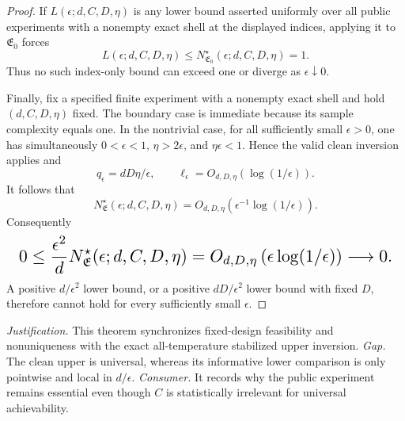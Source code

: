 \documentclass{article}
\begin{document}
\begin{proof}
If \(L(\epsilon;d,C,D,\eta)\) is any lower bound asserted uniformly over all public experiments with a nonempty exact shell at the displayed indices, applying it to \(\mathfrak E_0\) forces
\[
L(\epsilon;d,C,D,\eta)
\le N^\star_{\mathfrak E_0}(\epsilon;d,C,D,\eta)=1.
\]
Thus no such index-only bound can exceed one or diverge as \(\epsilon\downarrow0\).

Finally, fix a specified finite experiment with a nonempty exact shell and hold \((d,C,D,\eta)\) fixed. The boundary case is immediate because its sample complexity equals one. In the nontrivial case, for all sufficiently small \(\epsilon>0\), one has simultaneously \(0<\epsilon<1\), \(\eta>2\epsilon\), and \(\eta\epsilon<1\). Hence the valid clean inversion applies and
\[
q_\epsilon=dD\eta/\epsilon,
\qquad
\ell_\epsilon=O_{d,D,\eta}(\log(1/\epsilon)).
\]
It follows that
\[
N^\star_{\mathfrak E}(\epsilon;d,C,D,\eta)
=O_{d,D,\eta}\left(\epsilon^{-1}\log(1/\epsilon)\right).
\]
Consequently
\[
\makebox[\linewidth][c]{\resizebox{0.98\linewidth}{!}{\(\displaystyle 0\le\frac{\epsilon^2}{d}N^\star_{\mathfrak E}(\epsilon;d,C,D,\eta)
=O_{d,D,\eta}\left(\epsilon\log(1/\epsilon)\right)\longrightarrow0.\)}}
\]
A positive \(d/\epsilon^2\) lower bound, or a positive \(dD/\epsilon^2\) lower bound with fixed \(D\), therefore cannot hold for every sufficiently small \(\epsilon\).
\end{proof}
\par\smallskip\noindent \textit{Justification.} This theorem synchronizes fixed-design feasibility and nonuniqueness with the exact all-temperature stabilized upper inversion. \textit{Gap.} The clean upper is universal, whereas its informative lower comparison is only pointwise and local in \(d/\epsilon\). \textit{Consumer.} It records why the public experiment remains essential even though \(C\) is statistically irrelevant for universal achievability.
\end{document}
